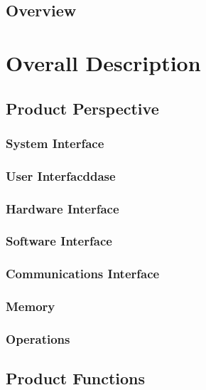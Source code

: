 \documentclass[12pt]{article}
\begin{document}
{        \subsection{Overview}
			


\pagebreak
	\section{Overall Description}


        \subsection{Product Perspective}


        	\subsubsection{System Interface}


            \subsubsection{User Interfacddase}



            \subsubsection{Hardware Interface}
		

            \subsubsection{Software Interface}
				

            \subsubsection{Communications Interface}


            \subsubsection{Memory}
		

            \subsubsection{Operations}


		\subsection{Product Functions}


}
\end{document}
